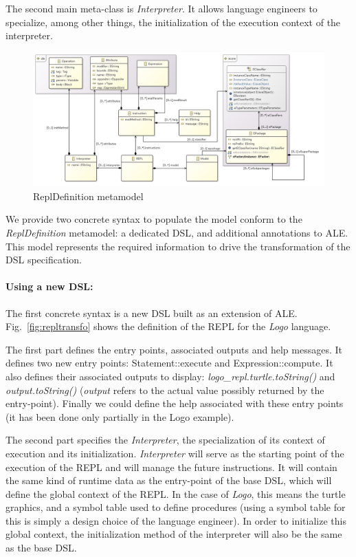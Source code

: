 The second main meta-class is \textit{Interpreter}. It allows language engineers to specialize, among other things, the initialization of the execution context of the interpreter. 

\begin{figure}[t]
	\centering
	\includegraphics[width=.95\linewidth]{figures/visitor2repl_class_diagram.png}
	\caption{ReplDefinition metamodel}
	\label{fig:ReplDefinitionMetamodel}
\end{figure}

We provide two concrete syntax to populate the model conform to the \textit{ReplDefinition} metamodel: a dedicated DSL, and additional annotations to ALE. This model represents the required information to drive the transformation of the DSL specification. 

\paragraph{Using a new DSL:}

The first concrete syntax is a new DSL built as an extension of ALE. Fig.~\ref{fig:repltransfo} shows the definition of the REPL for the \emph{Logo} language. 

The first part defines the entry points, associated outputs and help messages.  It defines two new entry points: Statement::execute and Expression::compute. It also defines their associated outputs to display: \textit{logo\_repl.turtle.toString()} and \textit{output.toString()} (\textit{output} refers to the actual value possibly returned by the entry-point). Finally we could define the help associated with these entry points (it has been done only partially in the Logo example). %

The second part specifies the \textit{Interpreter}, the specialization of its context of execution and its initialization.   
\textit{Interpreter} will serve as the starting point of the execution of the REPL and will manage the future instructions.
It will contain the same kind of runtime data as the entry-point of the base DSL, which will define the global context of the REPL. In the case of \textit{Logo}, this means the turtle graphics, and a symbol table used to define procedures (using a symbol table for this is simply a design choice of the language engineer). In order to initialize this global context, the initialization method of the interpreter will also be the same as the base DSL.

